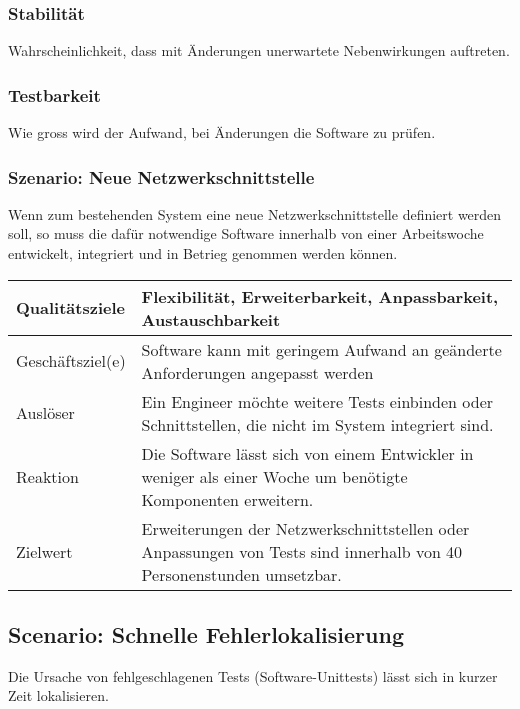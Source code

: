 \documentclass[
	ngerman,
	toc=listof, %
	toc=bibliography, %
	footnotes=multiple, %
	parskip=half, %
	numbers=noendperiod %
]{scrartcl}
\begin{document}
		\subsubsection{Stabilität}
			Wahrscheinlichkeit, dass mit Änderungen unerwartete Nebenwirkungen auftreten.

		\subsubsection{Testbarkeit}
			Wie gross wird der Aufwand, bei Änderungen die Software zu prüfen.

		\subsubsection{Szenario: Neue Netzwerkschnittstelle}
			Wenn zum bestehenden System eine neue Netzwerkschnittstelle definiert werden soll, so muss die dafür notwendige Software innerhalb von einer Arbeitswoche entwickelt, integriert und in Betrieg genommen werden können.

			\begin{tabularx}{\textwidth}{lX}
				\toprule
				Qualitätsziele & Flexibilität, Erweiterbarkeit, Anpassbarkeit, Austauschbarkeit  \\
				\midrule
				Geschäftsziel(e) & Software kann mit geringem Aufwand an geänderte Anforderungen angepasst werden  \\
				\midrule
				Auslöser & Ein Engineer möchte weitere Tests einbinden oder Schnittstellen, die nicht im System integriert sind.  \\
				\midrule
				Reaktion & Die Software lässt sich von einem Entwickler in weniger als einer Woche um benötigte Komponenten erweitern.  \\
				\midrule
				Zielwert & 	Erweiterungen der Netzwerkschnittstellen oder Anpassungen von Tests sind innerhalb von 40 Personenstunden umsetzbar.  \\
				\bottomrule
			\end{tabularx}

		\subsection{Scenario: Schnelle Fehlerlokalisierung}
			Die Ursache von fehlgeschlagenen Tests (Software-Unittests) lässt sich in kurzer Zeit lokalisieren.
\end{document}
